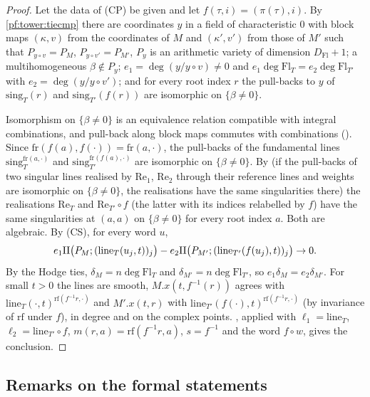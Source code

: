 \begin{proof}
Let the data of (CP) be given and let $f(\tau,i)=(\pi(\tau),i)$. By \cref{pf:tower:tiecmp} there are coordinates $y$ in a field
of characteristic $0$ with block maps $(\kappa,v)$ from the coordinates of $M$ and $(\kappa',v')$ from those of $M'$ such that
$P_{y\circ v}=P_M$, $P_{y\circ v'}=P_{M'}$, $P_y$ is an arithmetic variety of dimension $D_{\mathrm{Fl}}+1$; a multihomogeneous
$\beta\notin P_y$; $e_1=\deg(y/y\circ v)\ne0$ and $e_1\deg\mathrm{Fl}_T=e_2\deg\mathrm{Fl}_{T'}$ with $e_2=\deg(y/y\circ v')$; and for
every root index $r$ the pull-backs to $y$ of $\mathrm{sing}_T(r)$ and $\mathrm{sing}_{T'}(f(r))$ are isomorphic on
$\{\beta\ne0\}$.

Isomorphism on $\{\beta\ne0\}$ is an equivalence relation compatible with integral combinations, and pull-back along block maps
commutes with combinations (). Since $\mathrm{fr}(f(a),f(\cdot))=\mathrm{fr}(a,\cdot)$,
the pull-backs of the fundamental lines $\mathrm{sing}_T^{\mathrm{fr}(a,\cdot)}$ and $\mathrm{sing}_{T'}^{\mathrm{fr}(f(a),\cdot)}$
are isomorphic on $\{\beta\ne0\}$. By  (if the pull-backs of two
singular lines realised by $\mathrm{Re}_1$, $\mathrm{Re}_2$ through their reference lines and weights are isomorphic on
$\{\beta\ne0\}$, the realisations have the same singularities there) the realisations $\mathrm{Re}_T$ and $\mathrm{Re}_{T'}\circ f$
(the latter with its indices relabelled by $f$) have the same singularities at $(a,a)$ on $\{\beta\ne0\}$ for every root index $a$.
Both are algebraic. By (CS), for every word $u$,
\[
e_1\mathrm{II}\bigl(P_M;(\mathrm{line}_T(u_j,t))_j\bigr)-e_2\mathrm{II}\bigl(P_{M'};(\mathrm{line}_{T'}(f(u_j),t))_j\bigr)\to0.
\]
By the Hodge ties, $\delta_M=n\deg\mathrm{Fl}_T$ and $\delta_{M'}=n\deg\mathrm{Fl}_{T'}$, so $e_1\delta_M=e_2\delta_{M'}$. For small
$t>0$ the lines are smooth, $M.x(t,f^{-1}(r))$ agrees with $\mathrm{line}_T(\cdot,t)^{\mathrm{rf}(f^{-1}r,\cdot)}$ and $M'.x(t,r)$
with $\mathrm{line}_{T'}(f(\cdot),t)^{\mathrm{rf}(f^{-1}r,\cdot)}$ (by invariance of $\mathrm{rf}$ under $f$), in degree and on the
complex points. , applied with $\ell_1=\mathrm{line}_T$, $\ell_2=\mathrm{line}_{T'}\circ f$,
$m(r,a)=\mathrm{rf}(f^{-1}r,a)$, $s=f^{-1}$ and the word $f\circ w$, gives the conclusion.
\end{proof}

\subsection{Remarks on the formal statements}\label{pf:tower:sec-remarks}

